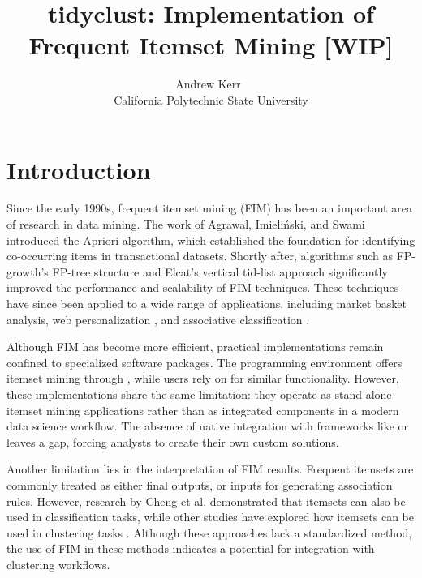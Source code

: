 \documentclass[
  article]{jss}
\author{Andrew Kerr~\orcidlink{0000-0003-0918-3766}\\California
Polytechnic State University}
\title{tidyclust: Implementation of Frequent Itemset Mining {[}WIP{]}}
\begin{document}
\maketitle


\section{Introduction}\label{sec-intro}

Since the early 1990s, frequent itemset mining (FIM) has been an
important area of research in data mining. The work of Agrawal,
Imieliński, and Swami \citeyearpar{agrawal_mining_1993} introduced the
Apriori algorithm, which established the foundation for identifying
co-occurring items in transactional datasets. Shortly after, algorithms
such as FP-growth's FP-tree structure \citep{han_mining_2000} and
Elcat's vertical tid-list approach \citep{zaki_scalable_2000}
significantly improved the performance and scalability of FIM
techniques. These techniques have since been applied to a wide range of
applications, including market basket analysis, web personalization
\citep{mobasher_effective_2001}, and associative classification
\citep{liu_integrating_1998}.

Although FIM has become more efficient, practical implementations remain
confined to specialized software packages. The 
\citep{r_core_team_r_2024} programming environment offers itemset mining
through  \citep{hahsler_arules_2011}, while
 users rely on 
\citep{raschka_mlxtend_2018} for similar functionality. However, these
implementations share the same limitation: they operate as stand alone
itemset mining applications rather than as integrated components in a
modern data science workflow. The absence of native integration with
frameworks like  \citep{kuhn_tidymodels_2020} or
 \citep{buitinck_api_2013} leaves a gap, forcing
analysts to create their own custom solutions.

Another limitation lies in the interpretation of FIM results. Frequent
itemsets are commonly treated as either final outputs, or inputs for
generating association rules. However, research by Cheng et al.
\citeyearpar{cheng_discriminative_2007} demonstrated that itemsets can
also be used in classification tasks, while other studies have explored
how itemsets can be used in clustering tasks
\citep{mobasher_effective_2001, wickramaratna_predicting_2009}. Although
these approaches lack a standardized method, the use of FIM in these
methods indicates a potential for integration with clustering workflows.
\end{document}
